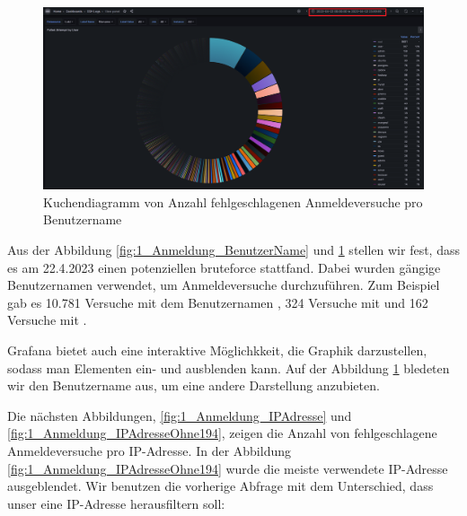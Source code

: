 \newpage
{}
\thispagestyle{lscape}
\begin{landscape}
    \begin{figure}[H]
        \centerline{\includegraphics[width=1.7\textwidth]{assets/Failed_pro_user2.png}}
        \caption[Kuchendiagramm von Anzahl fehlgeschlagenen Anmeldeversuche pro Benutzername]
        {Kuchendiagramm von Anzahl fehlgeschlagenen Anmeldeversuche pro Benutzername}
        \label{fig:1_Anmeldung_BenutzerNameOhneRoot}
        \centering
    \end{figure}
\end{landscape}
\restoregeometry

Aus der Abbildung \ref{fig:1_Anmeldung_BenutzerName} und \ref{fig:1_Anmeldung_BenutzerNameOhneRoot} stellen wir fest, dass es am 22.4.2023 einen potenziellen \gls{bruteforce} stattfand. Dabei wurden gängige Benutzernamen verwendet, um Anmeldeversuche durchzuführen. Zum Beispiel gab es 10.781 Versuche mit dem Benutzernamen , 324 Versuche mit  und 162 Versuche mit . 

Grafana bietet auch eine interaktive Möglichkkeit, die Graphik darzustellen, sodass man Elementen ein- und ausblenden kann. Auf der Abbildung \ref{fig:1_Anmeldung_BenutzerNameOhneRoot} bledeten wir den Benutzername  aus, um eine andere Darstellung anzubieten.

Die nächsten Abbildungen, \ref{fig:1_Anmeldung_IPAdresse} und \ref{fig:1_Anmeldung_IPAdresseOhne194}, zeigen die Anzahl von fehlgeschlagene Anmeldeversuche pro IP-Adresse. In der Abbildung \ref{fig:1_Anmeldung_IPAdresseOhne194} wurde die meiste verwendete IP-Adresse ausgeblendet. Wir benutzen die vorherige Abfrage mit dem Unterschied, dass unser \textcolor{blue}{} eine IP-Adresse herausfiltern soll:

